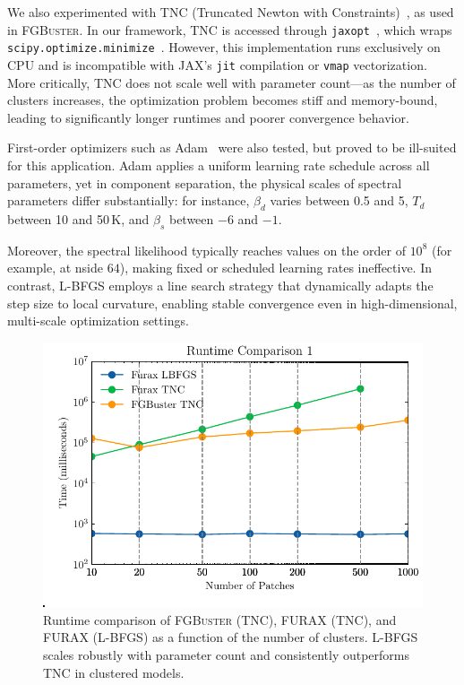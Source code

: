 \documentclass[%
 reprint,
bibnotes,
 amsmath,amssymb,
 aps,
floatfix, 
]{revtex4-2}
\begin{document}
We also experimented with TNC (Truncated Newton with Constraints)~\citep{TNC}, as used in \textsc{FGBuster}. In our framework, TNC is accessed through \texttt{jaxopt}~\citep{jaxopt}, which wraps \texttt{scipy.optimize.minimize}~\citep{scipy}. However, this implementation runs exclusively on CPU and is incompatible with JAX’s \texttt{jit} compilation or \texttt{vmap} vectorization. More critically, TNC does not scale well with parameter count---as the number of clusters increases, the optimization problem becomes stiff and memory-bound, leading to significantly longer runtimes and poorer convergence behavior.

First-order optimizers such as Adam~\citep{adam} were also tested, but proved to be ill-suited for this application. Adam applies a uniform learning rate schedule across all parameters, yet in component separation, the physical scales of spectral parameters differ substantially: for instance, \( \beta_d \) varies between 0.5 and 5, \( T_d \) between 10 and 50\,\(\mathrm{K}\), and \( \beta_s \) between \(-6\) and \(-1\).

Moreover, the spectral likelihood typically reaches values on the order of \( 10^8 \) (for example, at nside \( 64 \)), making fixed or scheduled learning rates ineffective. In contrast, L-BFGS employs a line search strategy that dynamically adapts the step size to local curvature, enabling stable convergence even in high-dimensional, multi-scale optimization settings.

\begin{figure}[H]
\centering
\includegraphics[width=0.9\columnwidth]{figures/runtime_comparison.pdf}
\caption{Runtime comparison of \textsc{FGBuster} (TNC), \textsc{FURAX} (TNC), and \textsc{FURAX} (L-BFGS) as a function of the number of clusters. L-BFGS scales robustly with parameter count and consistently outperforms TNC in clustered models. }
\label{fig:runtime_comparison}
\end{figure}
\end{document}
